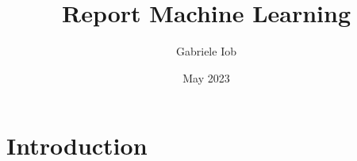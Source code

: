 \documentclass{article}
\title{Report Machine Learning}
\author{Gabriele Iob}
\date{May 2023}
\begin{document}
\maketitle

\section{Introduction}
\end{document}
